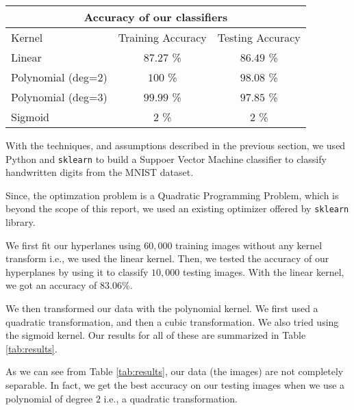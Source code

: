 
\begin{table*}[!htb]
	\centering
	\begin{tabular}{lcc}
		\toprule
		\multicolumn{3}{c}{\textbf{Accuracy of our classifiers}} \\
		\midrule
		Kernel & Training Accuracy & Testing Accuracy \\
		\midrule
		Linear & $87.27$ \% & $86.49$ \% \\
		Polynomial (deg=$2$) & $100$ \% & $98.08$ \% \\
		Polynomial (deg=$3$) & $99.99$ \% & $97.85$ \% \\
		Sigmoid & $2$ \% & $2$ \% \\
		\bottomrule
	\end{tabular}
	\caption{Accuracy of different classifiers}
	\label{tab:results}
\end{table*}

With the techniques, and assumptions described in the previous section, we used Python and \texttt{sklearn}\cite{scikit-learn} to build a Suppoer Vector Machine classifier to classify handwritten digits from the MNIST dataset.

Since, the optimzation problem is a Quadratic Programming Problem, which is beyond the scope of this report, we used an existing optimizer offered by \texttt{sklearn} library.

We first fit our hyperlanes using $60,000$ training images without any kernel transform i.e., we used the linear kernel. Then, we tested the accuracy of our hyperplanes by using it to classify $10,000$ testing images. With the linear kernel, we got an accuracy of $83.06 \%$.

We then transformed our data with the polynomial kernel. We first used a quadratic transformation, and then a cubic transformation. We also tried using the sigmoid kernel. Our results for all of these are summarized in Table \ref{tab:results}.

As we can see from Table \ref{tab:results}, our data (the images) are not completely separable. In fact, we get the best accuracy on our testing images when we use a polynomial of degree $2$ i.e., a quadratic transformation.
